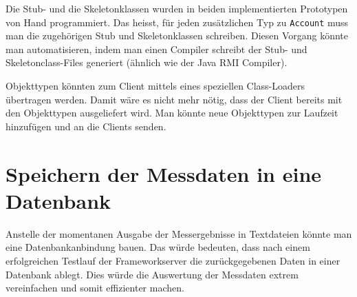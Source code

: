 Die Stub- und die Skeletonklassen wurden in beiden implementierten Prototypen von Hand programmiert. Das heisst, für jeden zusätzlichen Typ zu \texttt{Account} muss man die zugehörigen Stub und Skeletonklassen schreiben. Diesen Vorgang könnte man automatisieren, indem man einen Compiler schreibt der Stub- und Skeletonclass-Files generiert (ähnlich wie der Java RMI Compiler).

Objekttypen könnten zum Client mittels eines speziellen Class-Loaders übertragen werden. Damit wäre es nicht mehr nötig, dass der Client bereits mit den Objekttypen ausgeliefert wird. Man könnte neue Objekttypen zur Laufzeit hinzufügen und an die Clients senden.

\section{Speichern der Messdaten in eine Datenbank}
\label{sec:DBspeichern}
Anstelle der momentanen Ausgabe der Messergebnisse in Textdateien könnte man eine Datenbankanbindung bauen. Das würde bedeuten, dass nach einem erfolgreichen Testlauf der Frameworkserver die zurückgegebenen Daten in einer Datenbank ablegt. Dies würde die Auswertung der Messdaten extrem vereinfachen und somit effizienter machen.



